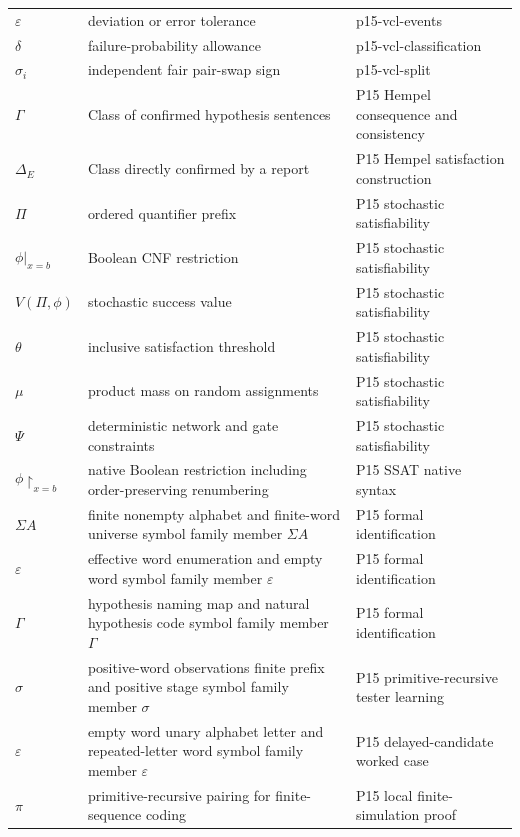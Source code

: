 \begin{longtable}{@{}p{}p{}p{}@{}}
\(\varepsilon\) & deviation or error tolerance & p15-\allowbreak{}vcl-\allowbreak{}events \\
\(\delta\) & failure-probability allowance & p15-\allowbreak{}vcl-\allowbreak{}classification \\
\(\sigma_i\) & independent fair pair-swap sign & p15-\allowbreak{}vcl-\allowbreak{}split \\
\(\Gamma\) & Class of confirmed hypothesis sentences & P15 Hempel consequence and consistency \\
\(\Delta_E\) & Class directly confirmed by a report & P15 Hempel satisfaction construction \\
\(\Pi\) & ordered quantifier prefix & P15 stochastic satisfiability \\
\(\phi|_{x=b}\) & Boolean CNF restriction & P15 stochastic satisfiability \\
\(V(\Pi,\allowbreak \phi)\) & stochastic success value & P15 stochastic satisfiability \\
\(\theta\) & inclusive satisfaction threshold & P15 stochastic satisfiability \\
\(\mu\) & product mass on random assignments & P15 stochastic satisfiability \\
\(\Psi\) & deterministic network and gate constraints & P15 stochastic satisfiability \\
\(\phi\upharpoonright_{x=b}\) & native Boolean restriction including order-preserving renumbering & P15 SSAT native syntax \\
\(\Sigma A\) & finite nonempty alphabet and finite-word universe symbol family member \(\Sigma A\) & P15 formal identification \\
\(\varepsilon\) & effective word enumeration and empty word symbol family member \(\varepsilon\) & P15 formal identification \\
\(\Gamma\) & hypothesis naming map and natural hypothesis code symbol family member \(\Gamma\) & P15 formal identification \\
\(\sigma\) & positive-word observations finite prefix and positive stage symbol family member \(\sigma\) & P15 primitive-\allowbreak{}recursive tester learning \\
\(\varepsilon\) & empty word unary alphabet letter and repeated-letter word symbol family member \(\varepsilon\) & P15 delayed-\allowbreak{}candidate worked case \\
\(\pi\) & primitive-recursive pairing for finite-sequence coding & P15 local finite-\allowbreak{}simulation proof \\

\end{longtable}

